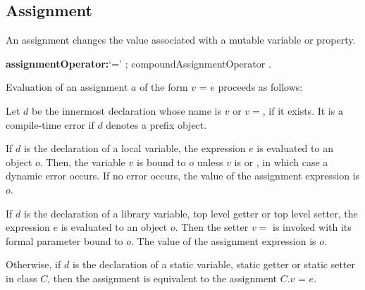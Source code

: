 \documentclass{article}
\newcommand{\code}[1]{{\sf #1}}
\begin{document}
\subsection{ Assignment}

\LMHash{}
An assignment changes the value associated with a mutable variable or property.

\begin{grammar}
{\bf assignmentOperator:}`=' ;
      compoundAssignmentOperator
    .
\end{grammar}

\LMHash{}
Evaluation of an assignment $a$ of the form $v$ \code{=} $e$ proceeds as follows:


 

\LMHash{}
Let $d$ be the innermost declaration whose name is $v$ or $v=$, if it exists.
It is a compile-time error if $d$ denotes a prefix object.

\LMHash{}
If $d$ is the declaration of a local variable, the expression $e$ is evaluated to an object $o$. Then, the variable $v$ is bound to $o$ unless $v$ is \FINAL{} or \CONST{}, in which case a dynamic error occurs.
If no error occurs, the value of the assignment expression is $o$.  


\LMHash{}
If $d$ is the declaration of a library variable, top level getter or top level setter, the expression $e$ is evaluated to an object $o$. Then the setter $v=$ is invoked with its formal parameter bound to $o$. The value of the assignment expression is $o$.  

\LMHash{}
Otherwise, if $d$ is the declaration of a static variable, static getter or static setter in class $C$, then the assignment is equivalent to the assignment \code{$C.v$ = $e$}.
\end{document}
